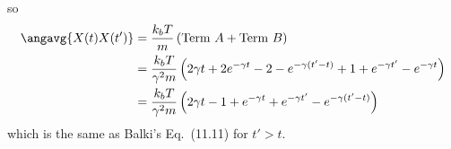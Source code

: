 so
\begin{align*}
  \angavg{X(t) X(t')}
  &= \frac{k_b T}{m} \left( \text{Term }A + \text{Term } B \right) \\
  &= \frac{k_b T}{\gamma^2 m} \left(
    2 \gamma t + 2 e^{-\gamma t} - 2 - e^{-\gamma(t' - t)} + 1 + e^{-\gamma t'} - e^{-\gamma t}
  \right) \\
  &= \frac{k_b T}{\gamma^2 m} \left(
    2 \gamma t - 1 + e^{-\gamma t} + e^{-\gamma t'} - e^{-\gamma(t' - t)}
  \right)
\end{align*}
which is the same as Balki's Eq.~(11.11) for $t' > t$.
